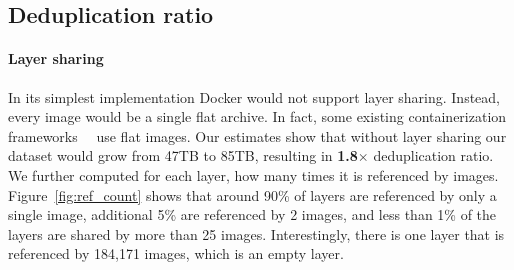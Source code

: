 \subsection{Deduplication ratio} 
\label{sec:dedup_ratio}

%
%
%

\paragraph{Layer sharing}

%

In its simplest implementation Docker would not support layer sharing.
%
Instead, every image would be a single flat archive.
%
In fact, some existing containerization frameworks~\cite{singularity}~\cite{openvz}  use flat images.
%
Our estimates show that without layer sharing our dataset would grow from 47TB
to 85TB, resulting in \textbf{1.8$\times$} deduplication ratio.
% 
We further computed for each layer, how many times it is referenced by images.
%
Figure~\ref{fig:ref_count} shows that around 90\% of layers are referenced by
only a single image, additional 5\% are referenced by 2 images, and less than
1\% of the layers are shared by more than 25 images.
%
%
%
%
%
%
%
Interestingly, there is one layer that is referenced by 184,171 images, which is an empty layer.
%

